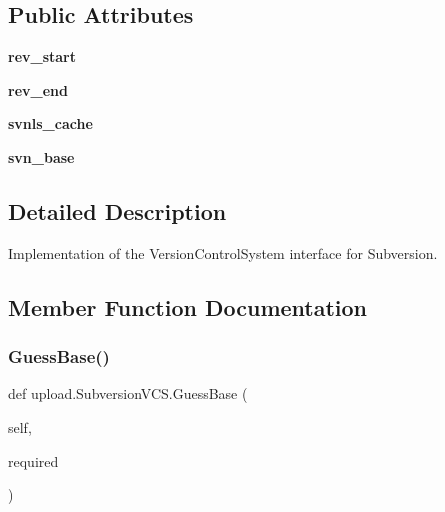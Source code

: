 \subsection*{Public Attributes}
\begin{DoxyCompactItemize}
\item 
\mbox{\label{classupload_1_1SubversionVCS_ad1553a69f4a790309273dbdeb9077732}} 
{\bfseries rev\+\_\+start}
\item 
\mbox{\label{classupload_1_1SubversionVCS_ac0bb07a099c722b7f8622de4b225904f}} 
{\bfseries rev\+\_\+end}
\item 
\mbox{\label{classupload_1_1SubversionVCS_aa801782f807674b06f491df5d7ca9942}} 
{\bfseries svnls\+\_\+cache}
\item 
\mbox{\label{classupload_1_1SubversionVCS_a60645c40d2fea4cd52881576bd13341f}} 
{\bfseries svn\+\_\+base}
\end{DoxyCompactItemize}


\subsection{Detailed Description}
\begin{DoxyVerb}Implementation of the VersionControlSystem interface for Subversion.\end{DoxyVerb}
 

\subsection{Member Function Documentation}
\mbox{\label{classupload_1_1SubversionVCS_a7d22d459469a757270502ce0dccacbd2}} 
\subsubsection{\texorpdfstring{Guess\+Base()}{GuessBase()}\hspace{0.1cm}{\footnotesize\ttfamily [1/2]}}
{\footnotesize\ttfamily def upload.\+Subversion\+V\+C\+S.\+Guess\+Base (\begin{DoxyParamCaption}\item[{}]{self,  }\item[{}]{required }\end{DoxyParamCaption})}

